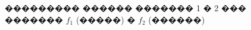 \documentclass[a4paper]{article}
\begin{document}
\begin{figure}[!h]
\begin{minipage}[h]{0.49\linewidth}
  \end{minipage}
  \caption{��������� ������ ������� 1 � 2 ��� ������� $f_1$ (�����) � $f_2$ (������)}
  \label{r1}
\end{figure}
\end{document}
